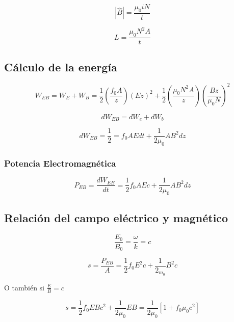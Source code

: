 \documentclass[]{article}
\begin{document}
\begin{equation}
|\hat{B}|=\frac{\mu_0 i N}{t}
\end{equation}


\begin{equation}
L=\frac{\mu_0 N^2 A}{t}
\end{equation}

\subsection{Cálculo de la energía}

\begin{equation}
   W_{EB}=W_E+W_B=\frac{1}{2}(\frac{f_0 A}{z})(Ez)^2+\frac{1}{2}(\frac{\mu_0 N^2 A}{z})(\frac{B z}{\mu_0 N})^2
\end{equation}


\begin{equation}
dW_{EB}=dW_e+dW_b
\end{equation}


\begin{equation}
   dW_{EB}=\frac{1}{2}=f_0AEdt+\frac{1}{2 \mu_0}AB^2dz
\end{equation}


\subsubsection{Potencia Electromagnética}

\begin{equation}
  P_{EB}=\frac{dW_{EB}}{dt}=\frac{1}{2}f_0AEc+\frac{1}{2 \mu_0}AB^2dz
\end{equation}


\subsection{Relación del campo eléctrico y magnético}

\begin{equation}
\frac{E_0}{B_0}=\frac{\omega}{k}=c
\end{equation}

\begin{equation}
   s=\frac{P_{EB}}{A}=\frac{1}{2}f_0E^2c+\frac{1}{2_{m_0}}B^2c
\end{equation}

O también si $\frac{E}{B}=c$

\begin{equation}
   s= \frac{1}{2}f_0EBc^2+\frac{1}{2 \mu_0}EB=\frac{1}{2 \mu_0}[1+f_0 \mu_0c^2]
\end{equation}
\end{document}
